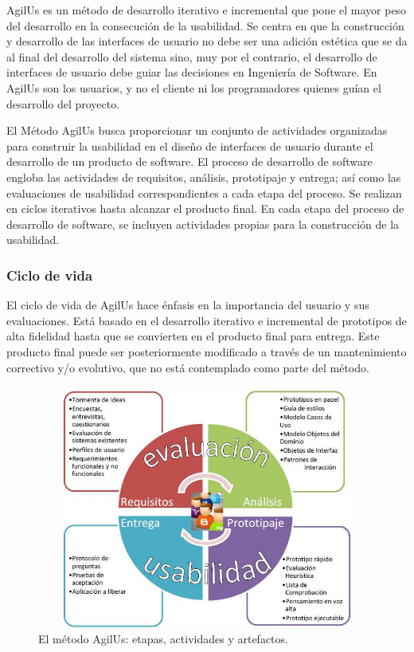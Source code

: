 	AgilUs es un método de desarrollo iterativo e incremental que pone el mayor peso del desarrollo en la consecución de la usabilidad. Se centra en que la construcción y desarrollo de las interfaces de usuario no debe ser una adición estética que se da al final del desarrollo del sistema sino, muy por el contrario, el desarrollo de interfaces de usuario debe guiar las decisiones en Ingeniería de Software. En AgilUs son los usuarios, y no el cliente ni los programadores quienes guían el desarrollo del proyecto.

	El Método AgilUs busca proporcionar un conjunto de actividades organizadas para construir la usabilidad en el diseño de interfaces de usuario durante el desarrollo de un producto de software. El proceso de desarrollo de software engloba las actividades de requisitos, análisis, prototipaje y entrega; así como las evaluaciones de usabilidad correspondientes a cada etapa del proceso. Se realizan en ciclos iterativos hasta alcanzar el producto final. En cada etapa del proceso de desarrollo de software, se incluyen actividades propias para la construcción de la usabilidad.

\setlength{\parskip}{0mm}

\subsubsection{Ciclo de vida}
\setlength{\parskip}{5mm}
	El ciclo de vida de AgilUs hace énfasis en la importancia del usuario y sus evaluaciones. Está basado en el desarrollo iterativo e incremental de prototipos de alta fidelidad hasta que se convierten en el producto final para entrega. Este producto final puede ser posteriormente modificado a través de un mantenimiento correctivo y/o evolutivo, que no está contemplado como parte del método.
	\setlength{\parskip}{0mm}
\pagebreak
\begin{figure}[H]
\begin{center}
	\includegraphics[width=13cm,height=8cm]{img/agilus.jpg}
\end{center}
\caption{El método AgilUs: etapas, actividades y artefactos.}
\label{fig:Agilus}
\end{figure}



